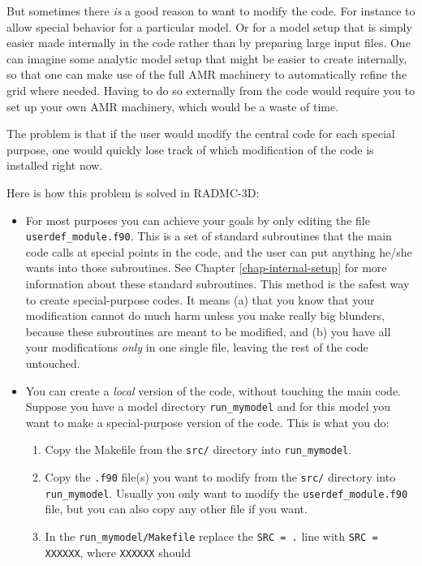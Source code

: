 \documentclass{report}
\begin{document}
But sometimes there {\em is} a good reason to want to modify the code.  For
instance to allow special behavior for a particular model. Or for a model
setup that is simply easier made internally in the code rather than by
preparing large input files. One can imagine some analytic model setup
that might be easier to create internally, so that one can make use of
the full AMR machinery to automatically refine the grid where needed.
Having to do so externally from the code would require you to set up
your own AMR machinery, which would be a waste of time. 

The problem is that if the user would modify the central code for each
special purpose, one would quickly lose track of which modification of the
code is installed right now. 

Here is how this problem is solved in RADMC-3D:
\begin{itemize}
\item For most purposes you can achieve your goals by only editing the file
  {\small\tt userdef\_module.f90}. This is a set of standard subroutines
  that the main code calls at special points in the code, and the user can
  put anything he/she wants into those subroutines. See Chapter \ref{chap-internal-setup} for more information about these standard
  subroutines. This method is the safest way to create special-purpose
  codes. It means (a) that you know that your modification cannot do much
  harm unless you make really big blunders, because these subroutines are
  meant to be modified, and (b) you have all your modifications {\em only}
  in one single file, leaving the rest of the code untouched.
\item You can create a {\em local} version of the code, without touching
the main code. Suppose you have a model directory {\small\tt run\_mymodel} and for
this model you want to make a special-purpose version of the code.
This is what you do:
\begin{enumerate}
\item Copy the Makefile from the {\small\tt src/} directory into {\small\tt run\_mymodel}.
\item Copy the {\small\tt .f90} file(s) you want to modify from the {\small\tt src/}
  directory into {\small\tt run\_mymodel}. Usually you only want to modify
  the {\small\tt userdef\_module.f90} file, but you can also copy any other 
  file if you want.
\item In the {\small\tt run\_mymodel/Makefile} replace the {\small\tt SRC =
    .} line with {\small\tt SRC = XXXXXX}, where {\small\tt XXXXXX} should

\end{enumerate}
\end{itemize}
\end{document}
